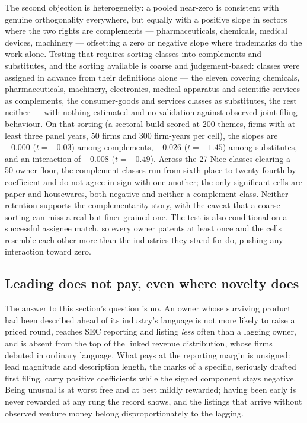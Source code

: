 The second objection is heterogeneity: a pooled near-zero is consistent
with genuine orthogonality everywhere, but equally with a positive slope
in sectors where the two rights are complements --- pharmaceuticals,
chemicals, medical devices, machinery --- offsetting a zero or negative
slope where trademarks do the work alone. Testing that requires sorting
classes into complements and substitutes, and the sorting available is
coarse and judgement-based: classes were assigned in advance from their
definitions alone --- the eleven covering chemicals, pharmaceuticals,
machinery, electronics, medical apparatus and scientific services as
complements, the consumer-goods and services classes as substitutes, the
rest neither --- with nothing estimated and no validation against
observed joint filing behaviour. On that sorting (a sectoral build scored
at 200 themes, firms with at least three panel years, 50 firms and 300
firm-years per cell), the slopes are $-0.000$ ($t = -0.03$) among
complements, $-0.026$ ($t = -1.45$) among substitutes, and an interaction
of $-0.008$ ($t = -0.49$). Across the 27 Nice classes clearing a 50-owner
floor, the complement classes run from sixth place to twenty-fourth by
coefficient and do not agree in sign with one another; the only
significant cells are paper and housewares, both negative and neither a
complement class. Neither retention supports the complementarity story,
with the caveat that a coarse sorting can miss a real but finer-grained
one. The test is also conditional on a successful assignee match, so
every owner patents at least once and the cells resemble each other more
than the industries they stand for do, pushing any interaction toward
zero.

\subsection{Leading does not pay, even where novelty does}\label{sec:success_conclusion}

The answer to this section's question is no. An owner whose surviving
product had been described ahead of its industry's language is not more
likely to raise a priced round, reaches SEC reporting and listing
\emph{less} often than a lagging owner, and is absent from the top of the
linked revenue distribution, whose firms debuted in ordinary language.
What pays at the reporting margin is unsigned: lead magnitude and
description length, the marks of a specific, seriously drafted first
filing, carry positive coefficients while the signed component stays
negative. Being unusual is at worst free and at best mildly rewarded;
having been early is never rewarded at any rung the record shows, and
the listings that arrive without observed venture money belong
disproportionately to the lagging.
